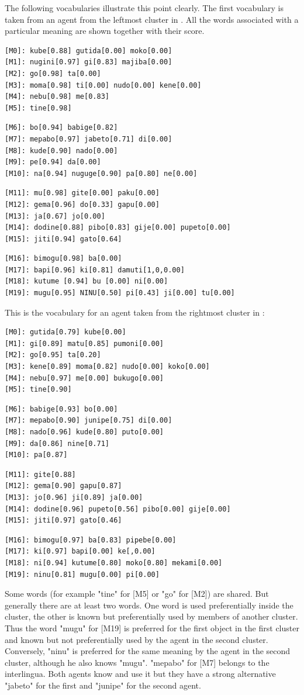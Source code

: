 The following vocabularies illustrate this point clearly.
The first vocabulary is taken from an agent from the
leftmost cluster in . 
All the words associated with a particular meaning are 
shown together with their score. 
\begin{verbatim}
[M0]: kube[0.88] gutida[0.00] moko[0.00]
[M1]: nugini[0.97] gi[0.83] majiba[0.00]
[M2]: go[0.98] ta[0.00]
[M3]: moma[0.98] ti[0.00] nudo[0.00] kene[0.00]
[M4]: nebu[0.98] me[0.83]
[M5]: tine[0.98]
\end{verbatim}
\begin{verbatim}
[M6]: bo[0.94] babige[0.82]
[M7]: mepabo[0.97] jabeto[0.71] di[0.00]
[M8]: kude[0.90] nado[0.00]
[M9]: pe[0.94] da[0.00]
[M10]: na[0.94] nuguge[0.90] pa[0.80] ne[0.00]
\end{verbatim}
\begin{verbatim}
[M11]: mu[0.98] gite[0.00] paku[0.00]
[M12]: gema[0.96] do[0.33] gapu[0.00]
[M13]: ja[0.67] jo[0.00]
[M14]: dodine[0.88] pibo[0.83] gije[0.00] pupeto[0.00]
[M15]: jiti[0.94] gato[0.64]
\end{verbatim}
\begin{verbatim}
[M16]: bimogu[0.98] ba[0.00]
[M17]: bapi[0.96] ki[0.81] damuti[1,0,0.00]
[M18]: kutume [0.94] bu [0.00] ni[0.00]
[M19]: mugu[0.95] NINU[0.50] pi[0.43] ji[0.00] tu[0.00]
\end{verbatim}
This is the vocabulary for an agent taken from the
rightmost cluster in :
\begin{verbatim}
[M0]: gutida[0.79] kube[0.00]
[M1]: gi[0.89] matu[0.85] pumoni[0.00]
[M2]: go[0.95] ta[0.20]
[M3]: kene[0.89] moma[0.82] nudo[0.00] koko[0.00]
[M4]: nebu[0.97] me[0.00] bukugo[0.00]
[M5]: tine[0.90]
\end{verbatim}
\begin{verbatim}
[M6]: babige[0.93] bo[0.00]
[M7]: mepabo[0.90] junipe[0.75] di[0.00]
[M8]: nado[0.96] kude[0.80] puto[0.00]
[M9]: da[0.86] nine[0.71]
[M10]: pa[0.87]
\end{verbatim}
\begin{verbatim}
[M11]: gite[0.88]
[M12]: gema[0.90] gapu[0.87]
[M13]: jo[0.96] ji[0.89] ja[0.00]
[M14]: dodine[0.96] pupeto[0.56] pibo[0.00] gije[0.00]
[M15]: jiti[0.97] gato[0.46]
\end{verbatim}
\begin{verbatim}
[M16]: bimogu[0.97] ba[0.83] pipebe[0.00]
[M17]: ki[0.97] bapi[0.00] ke[,0.00]
[M18]: ni[0.94] kutume[0.80] moko[0.80] mekami[0.00]
[M19]: ninu[0.81] mugu[0.00] pi[0.00]
\end{verbatim}
Some words (for example "tine" for [M5] or "go" for [M2]) are
shared. But generally 
there are at least two words. One word is used preferentially inside the cluster,
the other is known but preferentially used by members of another cluster. Thus
the word "mugu" for [M19] is preferred for the first object in the first
cluster and known but not preferentially used by the agent in the second cluster.
Conversely, "ninu" is preferred for the same meaning by the agent in the second
cluster, although he also knows "mugu".
"mepabo" for [M7] belongs to the interlingua. Both agents
know and use it but they have a strong alternative "jabeto" for 
the first and "junipe" for the second agent. 

